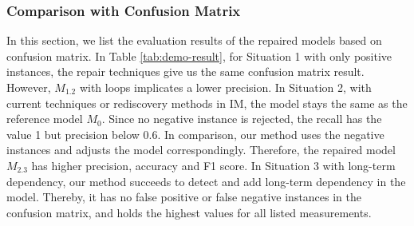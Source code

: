 \subsubsection{Comparison with Confusion Matrix}
In this section, we list the evaluation results of the repaired models based on confusion matrix. In Table \ref{tab:demo-result}, for Situation 1 with only positive instances, the repair techniques give us the same confusion matrix result. However,  $M_{1.2}$  with loops implicates a lower precision. In Situation 2, with current techniques or rediscovery methods in IM, the model stays the same as the reference  model $M_0$. Since no negative instance is rejected, the recall has the value 1 but precision below 0.6.  In comparison, our method uses the negative instances and adjusts the model correspondingly. Therefore, the repaired model $M_{2.3}$ has higher precision, accuracy and F1 score. In Situation 3 with long-term dependency, our method succeeds to detect and add long-term dependency in the model. Thereby, it has no false positive or false negative instances in the confusion matrix, and holds the highest values for all listed measurements.
